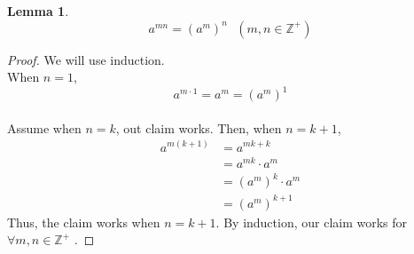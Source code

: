\documentclass{article}
\newcommand{\Z}{\mathbb{Z}}
\newtheorem{lem}[thm]{Lemma}
\begin{document}
\begin{lem}
\label{pow2}
$$a^{mn}=(a^{m})^{n} \text{   } (m,n\in \Z^{+})$$
\end{lem}
\begin{proof}
We will use induction. \\
When $n=1$, $$a^{m\cdot 1}=a^{m}=(a^{m})^{1}$$\\
Assume when $n=k$, out claim works. Then, when $n=k+1$,
\begin{equation}
    \begin{split}
        a^{m(k+1)} &= a^{mk+k}\\
        &= a^{mk}\cdot a^{m}\\
        &= (a^{m})^{k}\cdot a^{m}\\
        &= (a^{m})^{k+1}
    \end{split}
\end{equation}
Thus, the claim works when $n=k+1$. By induction, our claim works for $\forall m,n \in \Z^{+}$ .
\end{proof}
\end{document}
